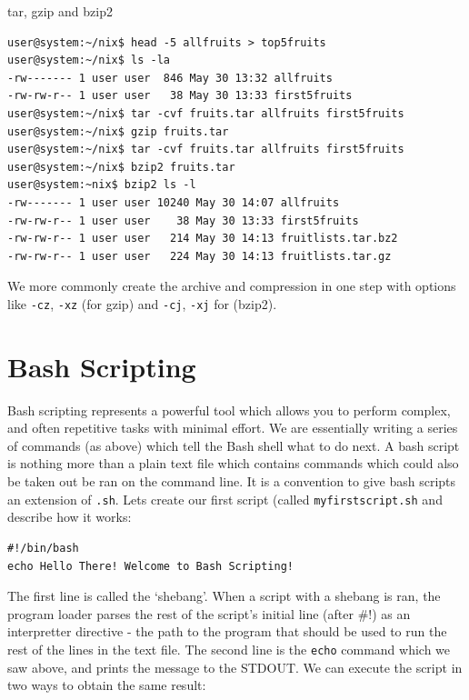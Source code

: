 \documentclass[11pt]{article}
\begin{document}
\begin{listing}[H]
\caption{tar, gzip and bzip2}\vspace{-0.1in}
\begin{verbatim}
user@system:~/nix$ head -5 allfruits > top5fruits
user@system:~/nix$ ls -la
-rw------- 1 user user  846 May 30 13:32 allfruits
-rw-rw-r-- 1 user user   38 May 30 13:33 first5fruits
user@system:~/nix$ tar -cvf fruits.tar allfruits first5fruits
user@system:~/nix$ gzip fruits.tar
user@system:~/nix$ tar -cvf fruits.tar allfruits first5fruits
user@system:~/nix$ bzip2 fruits.tar
user@system:~nix$ bzip2 ls -l
-rw------- 1 user user 10240 May 30 14:07 allfruits
-rw-rw-r-- 1 user user    38 May 30 13:33 first5fruits
-rw-rw-r-- 1 user user   214 May 30 14:13 fruitlists.tar.bz2
-rw-rw-r-- 1 user user   224 May 30 14:13 fruitlists.tar.gz
\end{verbatim}
\end{listing}

\noindent
We more commonly create the archive and compression in one step with options like \texttt{-cz}, \texttt{-xz} (for gzip) and \texttt{-cj}, \texttt{-xj} for (bzip2).

\section{Bash Scripting}

Bash scripting represents a powerful tool which allows you to perform complex, and often repetitive tasks with minimal effort. We are essentially writing a series of commands (as above) which tell the Bash shell what to do next. A bash script is nothing more than a plain text file which contains commands which could also be taken out be ran on the command line. It is a convention to give bash scripts an extension of \texttt{.sh}. Lets create our first script (called \texttt{myfirstscript.sh} and describe how it works:\\

\begin{listing}[H]
\begin{verbatim}
#!/bin/bash
echo Hello There! Welcome to Bash Scripting!
\end{verbatim}
\end{listing}

The first line is called the `shebang'. When a script with a shebang is ran, the program loader parses the rest of the script's initial line (after \#!) as an interpretter directive - the path to the program that should be used to run the rest of the lines in the text file. The second line is the \texttt{echo} command which we saw above, and prints the message to the STDOUT. We can execute the script in two ways to obtain the same result:\\
\end{document}
